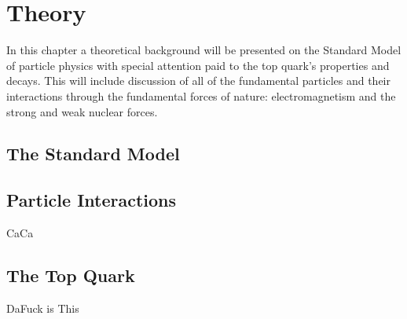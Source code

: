 
\chapter{Theory}
\label{ch:Theory}

In this chapter a theoretical background will be presented on the Standard Model of particle physics with special attention paid to the top quark's properties and decays.  This will include discussion of all of the fundamental particles and their interactions through the fundamental forces of nature: electromagnetism and the strong and weak nuclear forces.

\section{The Standard Model}


\section{Particle Interactions}
CaCa

\section{The Top Quark}
 DaFuck is This







